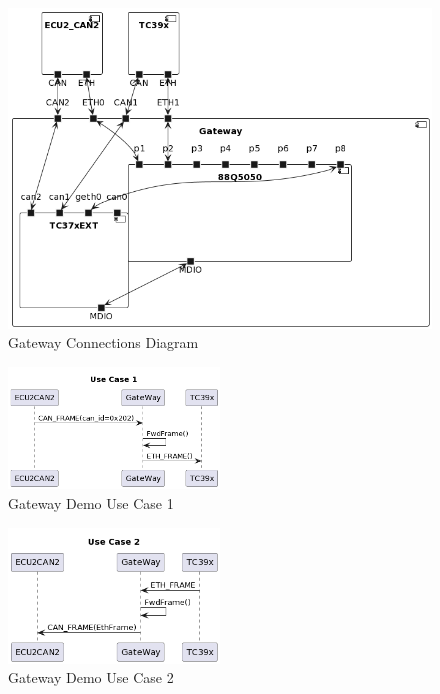 \begin{figure}[!htb]
 \centering
 \includegraphics[width=\textwidth]{img/GWConnectionsDiagram.png}
 \caption{Gateway Connections Diagram}
 \label{fig:connections-diagram}
\end{figure}

\begin{figure}[!htb]
 \centering
 \includegraphics[width=0.5\textwidth]{img/GWUseCase1.png}
 \caption{Gateway Demo Use Case 1}
 \label{fig:gw-demo-uc1}
\end{figure}

\begin{figure}[!htb]
 \centering
 \includegraphics[width=0.5\textwidth]{img/GWUseCase2.png}
 \caption{Gateway Demo Use Case 2}
 \label{fig:gw-demo-uc2}
\end{figure}


